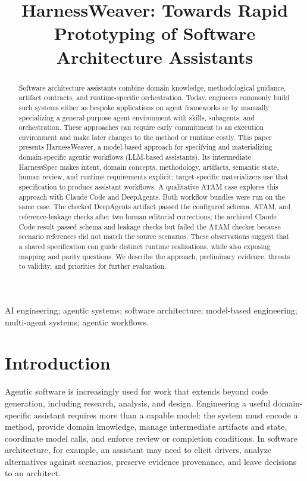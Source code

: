 \documentclass[10pt,conference]{IEEEtran}
\title{HarnessWeaver: Towards Rapid Prototyping of Software Architecture Assistants}
\begin{document}
\maketitle
\begin{abstract}
Software architecture assistants combine domain knowledge, methodological guidance, artifact contracts, and runtime-specific orchestration. Today, engineers commonly build such systems either as bespoke applications on agent frameworks or by manually specializing a general-purpose agent environment with skills, subagents, and orchestration. These approaches can require early commitment to an execution environment and make later changes to the method or runtime costly. This paper presents HarnessWeaver, a model-based approach for specifying and materializing domain-specific agentic workflows (LLM-based assistants). Its intermediate HarnessSpec makes intent, domain concepts, methodology, artifacts, semantic state, human review, and runtime requirements explicit; target-specific materializers use that specification to produce assistant workflows. A qualitative ATAM case explores this approach with Claude Code and DeepAgents. Both workflow bundles were run on the same case. The checked DeepAgents artifact passed the configured schema, ATAM, and reference-leakage checks after two human editorial corrections; the archived Claude Code result passed schema and leakage checks but failed the ATAM checker because scenario references did not match the source scenarios. These observations suggest that a shared specification can guide distinct runtime realizations, while also exposing mapping and parity questions. We describe the approach, preliminary evidence, threats to validity, and priorities for further evaluation.
\end{abstract}
\begin{IEEEkeywords}
AI engineering; agentic systems; software architecture; model-based engineering; multi-agent systems; agentic workflows.
\end{IEEEkeywords}
\section{Introduction}

Agentic software is increasingly used for work that extends beyond code generation, including research, analysis, and design. Engineering a useful domain-specific assistant requires more than a capable model: the system must encode a method, provide domain knowledge, manage intermediate artifacts and state, coordinate model calls, and enforce review or completion conditions. In software architecture, for example, an assistant may need to elicit drivers, analyze alternatives against scenarios, preserve evidence provenance, and leave decisions to an architect.
\end{document}
